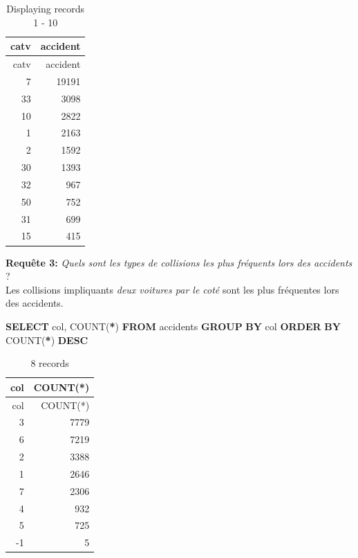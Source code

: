 \documentclass[mstat,12pt]{unswthesis}
\newenvironment{Shaded}{\begin{snugshade}}{\end{snugshade}}
\newcommand{\FunctionTok}[1]{\textcolor[rgb]{0.00,0.00,0.00}{#1}}
\newcommand{\KeywordTok}[1]{\textcolor[rgb]{0.13,0.29,0.53}{\textbf{#1}}}
\newcommand{\NormalTok}[1]{#1}
\newcommand{\OperatorTok}[1]{\textcolor[rgb]{0.81,0.36,0.00}{\textbf{#1}}}
\begin{document}
\begin{longtable}[]{@{}rr@{}}
\caption{Displaying records 1 - 10}\tabularnewline
\toprule()
catv & accident \\
\midrule()
\endfirsthead
\toprule()
catv & accident \\
\midrule()
\endhead
7 & 19191 \\
33 & 3098 \\
10 & 2822 \\
1 & 2163 \\
2 & 1592 \\
30 & 1393 \\
32 & 967 \\
50 & 752 \\
31 & 699 \\
15 & 415 \\
\bottomrule()
\end{longtable}

\medskip

\textbf{Requête 3:} \emph{Quels sont les types de collisions les plus
fréquents lors des accidents }?\\
Les collisions impliquants \emph{deux voitures par le coté} sont les
plus fréquentes lors des accidents.

\begin{Shaded}
\begin{Highlighting}[]
\KeywordTok{SELECT}\NormalTok{ col, }\FunctionTok{COUNT}\NormalTok{(}\OperatorTok{*}\NormalTok{)}
\KeywordTok{FROM}\NormalTok{ accidents}
\KeywordTok{GROUP} \KeywordTok{BY}\NormalTok{ col}
\KeywordTok{ORDER} \KeywordTok{BY} \FunctionTok{COUNT}\NormalTok{(}\OperatorTok{*}\NormalTok{) }\KeywordTok{DESC}
\end{Highlighting}
\end{Shaded}

\begin{longtable}[]{@{}rr@{}}
\caption{8 records}\tabularnewline
\toprule()
col & COUNT(*) \\
\midrule()
\endfirsthead
\toprule()
col & COUNT(*) \\
\midrule()
\endhead
3 & 7779 \\
6 & 7219 \\
2 & 3388 \\
1 & 2646 \\
7 & 2306 \\
4 & 932 \\
5 & 725 \\
-1 & 5 \\
\bottomrule()
\end{longtable}
\end{document}
